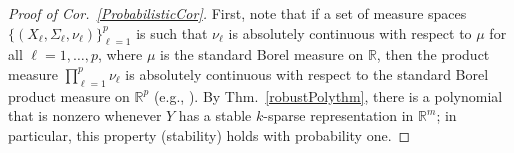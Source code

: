 \documentclass[9pt,twocolumn]{pnas-new}
\begin{document}
\begin{proof}[Proof of Cor.~\ref{ProbabilisticCor}]
First, note that if a set of measure spaces $\{(X_{\ell}, \Sigma_{\ell}, \nu_{\ell})\}_{\ell=1}^p$ is such that $\nu_{\ell}$ is absolutely continuous with respect to $\mu$ for all $\ell = 1, \ldots, p$, where $\mu$ is the standard Borel measure on $\mathbb{R}$, then the product measure $\prod_{\ell=1}^p \nu_{\ell}$ is absolutely continuous with respect to the standard Borel product measure on $\mathbb{R}^p$ (e.g.,  \cite{folland2013real}). By Thm.~\ref{robustPolythm}, there is a polynomial that is nonzero whenever $Y$ has a stable $k$-sparse representation in $\mathbb R^m$; in particular, this property (stability) holds with probability one.
\end{proof}


%
\end{document}
